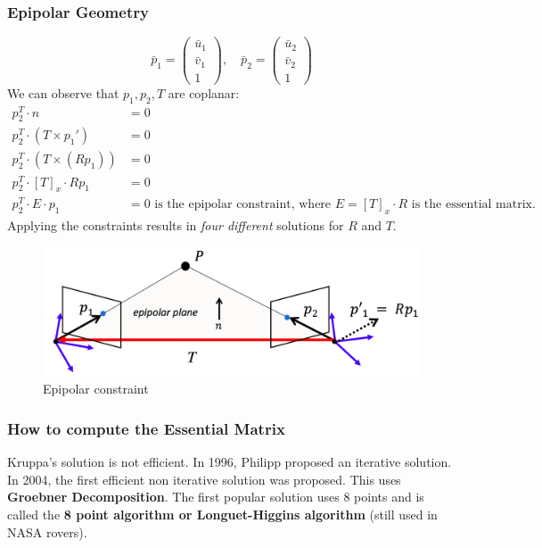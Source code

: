 \documentclass[a4paper,12 pt]{article}
\theoremstyle{definition}
\theoremstyle{remark}
\theoremstyle{definition}
\theoremstyle{definition}
\theoremstyle{definition}
\theoremstyle{remark}
\theoremstyle{definition}
\begin{document}
\subsubsection*{Epipolar Geometry}
\begin{equation}
\bar{p}_1=\begin{pmatrix}
\bar{u}_1\\
\bar{v}_1\\
1
\end{pmatrix},\quad \bar{p}_2=\begin{pmatrix}
\bar{u}_2\\
\bar{v}_2\\
1
\end{pmatrix}
\end{equation}
We can observe that $p_1,p_2,T$ are coplanar:
\begin{equation}
\begin{split}
p_2^T\cdot n&=0\\
p_2^T\cdot (T\times p_1')&=0\\
p_2^T \cdot (T\times (Rp_1))&=0\\
p_2^T\cdot [T]_x\cdot Rp_1&=0\\
p_2^T \cdot E \cdot p_1&=0 \text{ is the epipolar constraint, where }E=[T]_x\cdot R \text{ is the essential matrix}.
\end{split}
\end{equation}
Applying the constraints results in \textit{four different} solutions for $R$ and $T$.
\begin{figure}[h!]
\begin{center}
\includegraphics[scale=0.3]{pics/epi_2}
\caption{Epipolar constraint \label{fig:epi_2}}
\end{center}
\end{figure}
\subsubsection*{How to compute the Essential Matrix}
Kruppa's solution is not efficient. In 1996, Philipp proposed an iterative solution. In 2004, the first efficient non iterative solution was proposed. This uses \textbf{Groebner Decomposition}. The first popular solution uses 8 points and is called the \textbf{8 point algorithm or Longuet-Higgins algorithm} (still used in NASA rovers).
\end{document}
